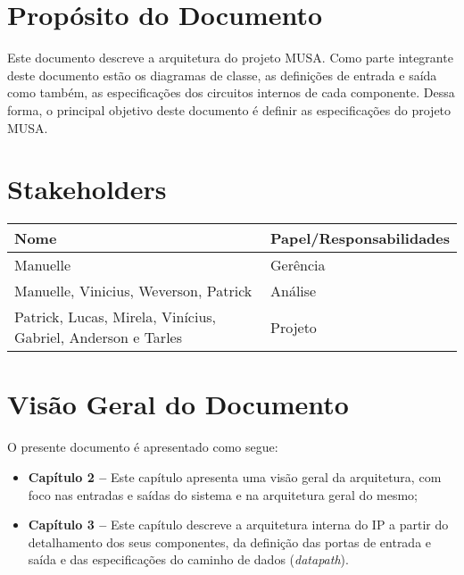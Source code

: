   \section{Propósito do Documento}
  Este documento descreve a arquitetura do projeto MUSA. Como parte integrante deste documento estão os diagramas de classe, as definições de entrada e saída como também, as especificações dos circuitos internos de cada componente. Dessa forma, o principal objetivo deste documento é definir as especificações do projeto MUSA.

  \section{Stakeholders}
    \FloatBarrier
    \begin{table}[H] 
      \begin{center}
        \begin{tabular}[pos]{|m{6cm} | m{8cm}|} 
          \hline 
          \cellcolor[gray]{0.9}\textbf{Nome} & \cellcolor[gray]{0.9}\textbf{Papel/Responsabilidades} \\  
           \hline Manuelle 	& Gerência \\
           \hline Manuelle, Vinicius, Weverson, Patrick 	& Análise \\
           \hline Patrick, Lucas, Mirela, Vinícius, Gabriel, Anderson e Tarles 	& Projeto \\ \hline
        \end{tabular}
      \end{center}
    \end{table} 

\section{Visão Geral do Documento}

O presente documento é apresentado como segue:

  \begin{itemize}
   \item \textbf{Capítulo 2 --} Este capítulo apresenta uma visão geral da arquitetura, com foco nas entradas e saídas do sistema e na arquitetura geral do mesmo;
   \item \textbf{Capítulo 3 --} Este capítulo descreve a arquitetura interna do IP a partir do detalhamento dos seus componentes, da definição das portas de entrada e saída e das especificações do caminho de dados (\textit{datapath}).
  \end{itemize}

